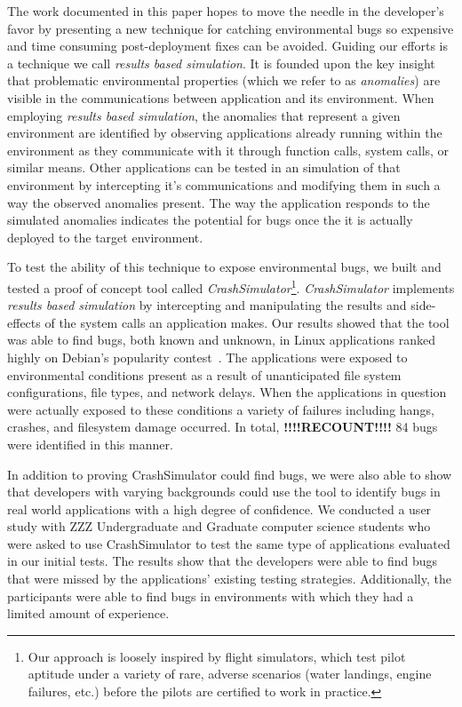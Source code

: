 The work documented in this paper
hopes to move the needle in the developer's favor
by presenting a new technique for catching environmental bugs
so expensive and time consuming post-deployment fixes can be avoided.
Guiding our efforts
is a technique
we call \textit{results based simulation}.
It is founded upon the key insight
that problematic environmental properties
(which we refer to as \textit{anomalies})
are visible in the communications
between application and its environment.
When employing \textit{results based simulation},
the anomalies that represent a given environment
are identified by
observing applications already running within the environment
as they communicate with it
through function calls,
system calls,
or similar means.
Other applications can be tested in an simulation of that environment
by intercepting it's communications
and modifying them in such a way
the observed anomalies present.
The way the application responds to the simulated anomalies
indicates the potential for bugs once the it is actually deployed
to the target environment.

To test the ability of this technique to expose environmental
bugs, we built and tested a proof of concept tool
called {\em CrashSimulator}\footnote{Our approach is
loosely inspired by flight simulators, which test pilot aptitude under a
variety of rare, adverse scenarios (water landings, engine failures, etc.)
before the pilots are certified to work in practice.}.
{\em CrashSimulator} implements \textit{results based simulation}
by intercepting and manipulating the results and side-effects
of the system calls an application makes.
Our results showed that the tool was able to find bugs,
both known and unknown,
in Linux applications ranked highly on Debian's popularity
contest~\cite{DebPopCon}.  The applications were exposed to
environmental conditions present as a result of unanticipated
file system configurations, file types, and network delays.
When the applications in
question were actually exposed to these conditions a variety of failures
including hangs, crashes, and filesystem damage occurred.  In total,
\textbf{!!!!RECOUNT!!!!} 84
bugs were identified in this manner.

In addition to proving CrashSimulator could find bugs, we were also able to
show that developers with varying backgrounds
could use the tool to identify bugs
in real world applications
with a high degree of confidence.
We conducted a user study with
ZZZ Undergraduate and Graduate computer science students
who were asked to use CrashSimulator to test
the same type of applications evaluated in our initial tests.
The results show that the developers were able to find bugs
that were missed by the applications' existing testing strategies.
Additionally, the
participants were able to find bugs
in environments with which they had a limited amount of experience.


